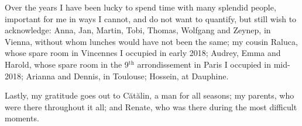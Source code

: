 Over the years I have been lucky to spend time with many splendid people,
important for me in ways I cannot, and do not want to quantify, but still wish 
to acknowledge:
Anna, Jan, Martin, Tobi, Thomas, Wolfgang and Zeynep, in Vienna, 
without whom lunches would have not been the same; 
my cousin Raluca, whose spare room in Vincennes I occupied in early 2018;
Audrey, Emma and Harold, whose spare room in the 9$^{\text{th}}$ arrondissement in Paris
I occupied in mid-2018; 
Arianna and Dennis, in Toulouse;
Hossein, at Dauphine.

Lastly, my gratitude goes out to Cătălin, a man for all seasons;
my parents, who were there throughout it all;
and Renate, who was there during the most difficult moments.